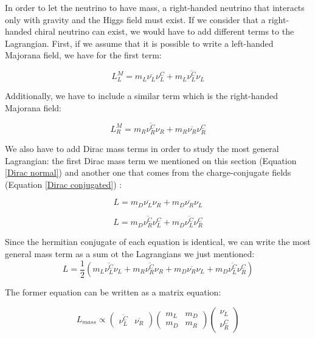 In order to let the neutrino to have mass, a right-handed neutrino that interacts only with gravity and the Higgs field must exist.
If we consider that a right-handed chiral neutrino can exist, we would have to add different terms to the Lagrangian. First, if 
we assume that it is possible to write a left-handed Majorana field, we have for the first term:

\begin{equation}
L_L^{M} = m_L \overline{\nu_L} \nu_{L}^C + m_L \overline{\nu_L^C} \nu_L
\end{equation}

Additionally, we have to include a similar term which is the right-handed Majorana field:

\begin{equation}
L_R^{M} = m_R \overline{\nu_R^C} \nu_{R} + m_R \overline{\nu_R} \nu_R^C
\end{equation}

We also have to add Dirac mass terms in order to study the most general Lagrangian: the first Dirac mass term we mentioned on this section (Equation \ref{Dirac normal}) and another one that comes from the 
charge-conjugate fields (Equation \ref{Dirac conjugated}) \cite{Theory_neutrinos}:

\begin{equation}\label{Dirac normal}
L = m_D \overline{\nu_L}\nu_R + m_D \overline{\nu_R}\nu_L
\end{equation} 

\begin{equation}\label{Dirac conjugated}
L = m_D \overline{\nu_R^C} \nu_L^C + m_D \overline{\nu_L^C}\nu_R^C
\end{equation} 

Since the hermitian conjugate of each equation is identical, we can write the most general mass term as a sum ot the Lagrangians we just mentioned:
\begin{equation}
L = \frac{1}{2} \left( m_L \overline{\nu_L^C} \nu_L + m_R \overline{\nu_R^C} \nu_{R} + m_D \overline{\nu_R}\nu_L + m_D \overline{\nu_L^C}\nu_R^C   \right)
\end{equation}

The former equation can be written as a matrix equation: 

\begin{equation}\label{matrix_m_sa}
L_{mass} \propto
\begin{pmatrix} 
  \overline{\nu_L^C} & \overline{\nu_R}
\end{pmatrix}
\begin{pmatrix}
  m_L & m_D \\
  m_D & m_R  
\end{pmatrix}
\begin{pmatrix}
  \nu_L \\
  \nu_R^C  
\end{pmatrix}
\end{equation}


